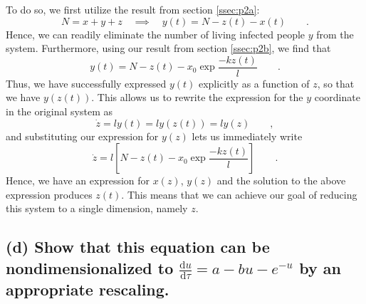 \documentclass[draft]{agujournal2019}
\begin{document}
To do so, we first utilize the result from section \ref{ssec:p2a}:
\begin{equation*}
    N = x + y + z \quad \implies \quad y(t) = N - z(t) - x(t) \qquad .
\end{equation*}
Hence, we can readily eliminate the number of living infected people $y$ from the system. Furthermore, using our result from section \ref{ssec:p2b}, we find that 
\begin{equation*}
    y(t) = N - z(t) - x_0\exp{\frac{-kz(t)}{l}} \qquad .
\end{equation*}
Thus, we have successfully expressed $y(t)$ explicitly as a function of $z$, so that we have $y(z(t))$. This allows us to rewrite the expression for the $y$ coordinate in the original system as
\begin{equation*}
    \dot z = l y(t) = ly(z(t)) = ly(z) \qquad ,
\end{equation*}
and substituting our expression for $y(z)$ lets us immediately write
\begin{equation}
\label{eqn:p2_z}
    \dot z = l\left[ N - z(t) - x_0\exp{\frac{-kz(t)}{l}} \right] \qquad .
\end{equation}
Hence, we have an expression for $x(z)$, $y(z)$ and the solution to the above expression produces $z(t)$. This means that we can achieve our goal of reducing this system to a single dimension, namely $z$. 



\subsection{(d) Show that this equation can be nondimensionalized to $\frac{\mathrm{d}u}{\mathrm{d}\tau} = a - bu - e^{-u}$ by an appropriate rescaling.}
\label{ssec:p2d}
\end{document}
